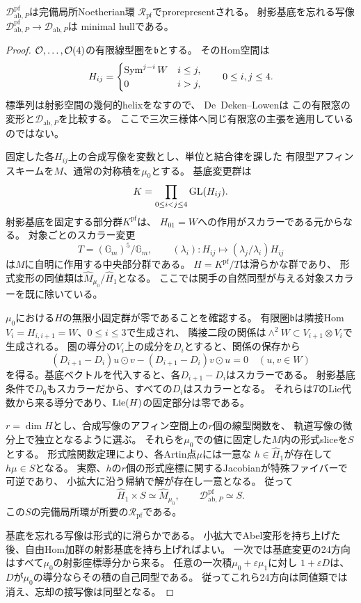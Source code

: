 \begin{lemma}[有限窓の形式slice]
\label{lem:formal-beilinson-frame}
$\mathcal D^{\mathrm{pf}}_{\mathrm{ab},P}$は完備局所Noetherian環
$\mathcal R_{\mathrm{pf}}$でprorepresentされる。
射影基底を忘れる写像
$\mathcal D^{\mathrm{pf}}_{\mathrm{ab},P}\to\mathcal D_{\mathrm{ab},P}$は
minimal hullである。
\end{lemma}
\begin{proof}
$\mathcal O,\ldots,\mathcal O(4)$の有限線型圏を$\mathfrak b$とする。
そのHom空間は
\[
 H_{ij}=\begin{cases}\operatorname{Sym}^{j-i}W&i\le j,\\0&i>j,\end{cases}
 \qquad 0\le i,j\le4.
\]
標準列は射影空間の幾何的helixをなすので、
De~Deken--Lowen\cite[Theorem~5.15]{DeDekenLowen}は
この有限窓の変形と$\mathcal D_{\mathrm{ab},P}$を比較する。
ここで三次三様体へ同じ有限窓の主張を適用しているのではない。

固定した各$H_{ij}$上の合成写像を変数とし、単位と結合律を課した
有限型アフィンスキームを$M$、通常の対称積を$\mu_0$とする。
基底変更群は
\[
 K=\prod_{0\le i<j\le4}\mathrm{GL}(H_{ij}).
\]
射影基底を固定する部分群$K^{\mathrm{pf}}$は、
$H_{01}=W$への作用がスカラーである元からなる。
対象ごとのスカラー変更
\[
 T=(\mathbb G_m)^5/\mathbb G_m,
 \qquad (\lambda_i)\colon H_{ij}\longmapsto
       (\lambda_j/\lambda_i)H_{ij}
\]
は$M$に自明に作用する中央部分群である。
$H=K^{\mathrm{pf}}/T$は滑らかな群であり、
形式変形の同値類は$\widehat M_{\mu_0}/\widehat H_1$となる。
ここでは関手の自然同型が与える対象スカラーを既に除いている。

$\mu_0$における$H$の無限小固定群が零であることを確認する。
有限圏$\mathfrak b$は隣接Hom
$V_i=H_{i,i+1}=W$、$0\le i\le3$で生成され、
隣接二段の関係は$\wedge^2W\subset V_{i+1}\otimes V_i$で生成される。
圏の導分の$V_i$上の成分を$D_i$とすると、関係の保存から
\[
 (D_{i+1}-D_i)u\mathbin{\odot}v
 -(D_{i+1}-D_i)v\mathbin{\odot}u=0
 \quad(u,v\in W)
\]
を得る。基底ベクトルを代入すると、各$D_{i+1}-D_i$はスカラーである。
射影基底条件で$D_0$もスカラーだから、すべての$D_i$はスカラーとなる。
それらは$T$のLie代数から来る導分であり、$\operatorname{Lie}(H)$の固定部分は零である。

$r=\dim H$とし、合成写像のアフィン空間上の$r$個の線型関数を、
軌道写像の微分上で独立となるように選ぶ。
それらを$\mu_0$での値に固定した$M$内の形式sliceを$S$とする。
形式陰関数定理により、各Artin点$\mu$には一意な
$h\in\widehat H_1$が存在して$h\mu\in S$となる。
実際、$h$の$r$個の形式座標に関するJacobianが特殊ファイバーで可逆であり、
小拡大に沿う帰納で解が存在し一意となる。
従って
\[
 \widehat H_1\times S\simeq\widehat M_{\mu_0},
 \qquad\mathcal D^{\mathrm{pf}}_{\mathrm{ab},P}\simeq S.
\]
この$S$の完備局所環が所要の$\mathcal R_{\mathrm{pf}}$である。

基底を忘れる写像は形式的に滑らかである。
小拡大でAbel変形を持ち上げた後、自由Hom加群の射影基底を持ち上げればよい。
一次では基底変更の24方向はすべて$\mu_0$の射影座標導分から来る。
任意の一次積$\mu_0+\varepsilon\mu_1$に対し
$1+\varepsilon D$は、$D$が$\mu_0$の導分ならその積の自己同型である。
従ってこれら24方向は同値類では消え、忘却の接写像は同型となる。
\end{proof}

